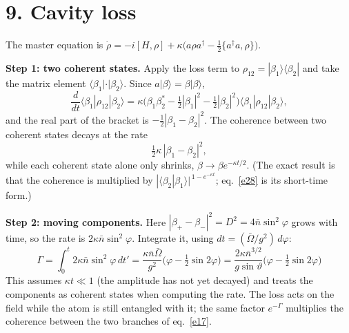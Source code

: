 \documentclass[11pt,letterpaper]{article}
\newcommand{\nbar}{\bar{n}}
\newcommand{\Obar}{\bar{\Omega}}
\newcommand{\ket}[1]{|#1\rangle}
\newcommand{\bra}[1]{\langle#1|}
\newcommand{\braket}[2]{\langle#1|#2\rangle}
\begin{document}
\section*{9. Cavity loss}
The master equation is $\dot\rho=-i[H,\rho]+\kappa\bigl(a\rho a^\dagger-\tfrac12\{a^\dagger a,\rho\}\bigr)$.

\textbf{Step 1: two coherent states.} Apply the loss term to $\rho_{12}=\ket{\beta_1}\bra{\beta_2}$ and
take the matrix element $\bra{\beta_1}\cdot\ket{\beta_2}$. Since $a\ket{\beta}=\beta\ket{\beta}$,
\[
\frac{d}{dt}\bra{\beta_1}\rho_{12}\ket{\beta_2}=\kappa\bigl(\beta_1\beta_2^*-\tfrac12|\beta_1|^2-\tfrac12|\beta_2|^2\bigr)
\bra{\beta_1}\rho_{12}\ket{\beta_2},
\]
and the real part of the bracket is $-\tfrac12|\beta_1-\beta_2|^2$. The coherence between two
coherent states decays at the rate
\begin{equation}\label{e28}
\tfrac12\kappa\,|\beta_1-\beta_2|^2 ,
\end{equation}
while each coherent state alone only shrinks, $\beta\to\beta e^{-\kappa t/2}$. (The exact result is
that the coherence is multiplied by $|\braket{\beta_2}{\beta_1}|^{\,1-e^{-\kappa t}}$; eq.~\eqref{e28} is its
short-time form.)

\textbf{Step 2: moving components.} Here $|\beta_+-\beta_-|^2=D^2=4\nbar\sin^2\varphi$ grows with time,
so the rate is $2\kappa\nbar\sin^2\varphi$. Integrate it, using $dt=(\Obar/g^2)\,d\varphi$:
\begin{equation}\label{e29}
\boxed{\;\Gamma=\int_0^t2\kappa\nbar\sin^2\varphi\,dt'=\frac{\kappa\nbar\Obar}{g^2}\bigl(\varphi-\tfrac12\sin2\varphi\bigr)
=\frac{2\kappa\nbar^{3/2}}{g\sin\vartheta}\bigl(\varphi-\tfrac12\sin2\varphi\bigr)\;}
\end{equation}
This assumes $\kappa t\ll1$ (the amplitude has not yet decayed) and treats the components as
coherent states when computing the rate. The loss acts on the field while the atom is still
entangled with it; the same factor $e^{-\Gamma}$ multiplies the coherence between the two branches
of eq.~\eqref{e17}.
\end{document}
